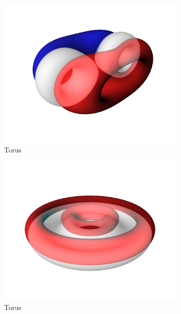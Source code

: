 \documentclass{l4proj}
\begin{document}
%
\begin{figure}[H]
  \begin{subfigure}[b]{0.24\textwidth}
    \includegraphics[width=\textwidth]{images/representations/onion-torus.png}
    \caption{Torus}
    \label{fig:rep_onion-torus1}
  \end{subfigure}
  \begin{subfigure}[b]{0.24\textwidth}
    \includegraphics[width=\textwidth]{images/representations/onion-torus-2.png}
    \caption{Torus}
    \label{fig:rep_onion-torus2}
  \end{subfigure}
  \begin{subfigure}[b]{0.24\textwidth}

\end{subfigure}
\end{figure}
\end{document}
